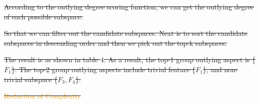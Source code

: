 \documentclass[
 size=14pt,
 paper=smartboard,  %
 mode=present, 		%
 display=slides, 	%
 style=tuliplab,  	%
 pauseslide,
 fleqn,leqno]{powerdot}
\providecommand{\DIFdeltex}[1]{{\protect\color{red}\sout{#1}}}                      %
\providecommand{\DIFdelbegin}{} %
\providecommand{\DIFdelend}{} %
\providecommand{\DIFdel}[1]{\texorpdfstring{\DIFdeltex{#1}}{}} %
\newcommand{\DIFscaledelfig}{0.5}
\newlength{\DIFdelgraphicswidth} %
\newlength{\DIFdelgraphicsheight} %
\newcommand{\DIFdelincludegraphics}[2][]{%
\sbox{\DIFdelgraphicsbox}{\DIFOincludegraphics[#1]{#2}}%
\settoboxwidth{\DIFdelgraphicswidth}{\DIFdelgraphicsbox} %
\settoboxtotalheight{\DIFdelgraphicsheight}{\DIFdelgraphicsbox} %
\scalebox{\DIFscaledelfig}{%
\parbox[b]{\DIFdelgraphicswidth}{\usebox{\DIFdelgraphicsbox}\\[-\baselineskip] \rule{\DIFdelgraphicswidth}{0em}}\llap{\resizebox{\DIFdelgraphicswidth}{\DIFdelgraphicsheight}{%
\setlength{\unitlength}{\DIFdelgraphicswidth}%
\begin{picture}(1,1)%
\thicklines\linethickness{2pt} %
{\color[rgb]{1,0,0}\put(0,0){\framebox(1,1){}}}%
{\color[rgb]{1,0,0}\put(0,0){\line( 1,1){1}}}%
{\color[rgb]{1,0,0}\put(0,1){\line(1,-1){1}}}%
\end{picture}%
}\hspace*{3pt}}} %
} %
\DeclareRobustCommand{\DIFdelbegin}{\DIFOdelbegin \let\includegraphics\DIFdelincludegraphics} %
\DeclareRobustCommand{\DIFdelend}{\DIFOaddend \let\includegraphics\DIFOincludegraphics} %
\begin{document}
\DIFdelbegin %
\DIFdel{According to the outlying degree scoring function,
we can get the outlying degree of each possible subspace.
}\DIFdelend %

\DIFdelbegin \DIFdel{So that we can filter out the candidate subspaces.
Next is to sort the candidate subspaces in
descending order and then we pick out the top-k subspaces.
}\DIFdelend %

\DIFdelbegin \DIFdel{The result is as shown in table $4$.
As a result,
the top-1 group outlying aspect is \{$F_1$\}.
The top-2 group outlying aspects include
trivial feature \{$F_1$\},
and non-trivial subspace \{$F_3, F_4$\}.
}%
\DIFdelend %

\DIFdelbegin %
\DIFdelend %


\DIFdelbegin %
\DIFdel{\textcolor{orange}{Reduction of Complexity}
}\DIFdelend %
\end{document}
